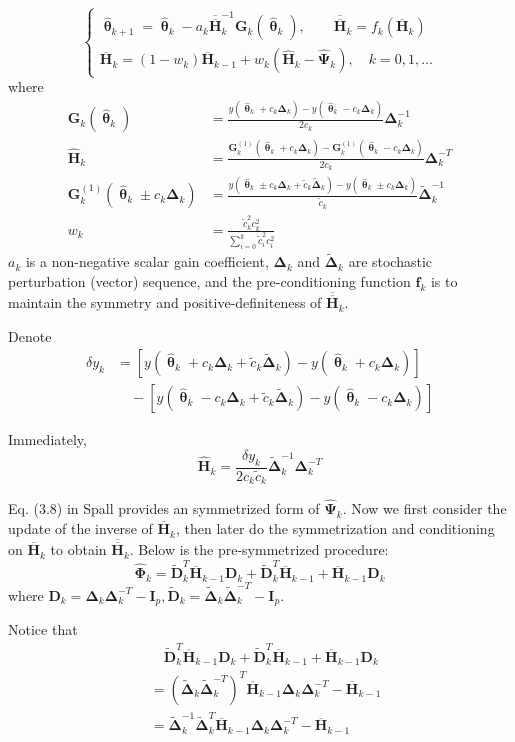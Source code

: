 \documentclass[conference]{IEEEtran}
\newcommand{\bD}{\bm{D}}
\newcommand{\bG}{\bm{G}}
\newcommand{\bI}{\bm{I}}
\newcommand{\bDelta}{\bm{\Delta}}
\newcommand{\oH}{\bm{\overline{H}}}
\newcommand{\ooH}{\bm{\overline{\overline{H}}}}
\newcommand{\hH}{\bm{\hat{H}}}
\newcommand{\hPsi}{\bm{\hat{\Psi}}}
\newcommand{\htheta}{\bm{\hat{\uptheta}}}
\newcommand{\hPhi}{\bm{\hat{\Phi}}}
\newcommand{\tDelta}{\bm{\tilde{\Delta}}}
\newcommand{\tD}{\bm{\tilde{D}}}
\begin{document}
$$\begin{cases}
	\htheta_{k+1}=\htheta_k-a_k\ooH_k^{-1} \bG_k(\htheta_k),\qquad \bm{\ooH}_k=f_k(\oH_k)\\
	\oH_k=(1-w_k)\oH_{k-1}+w_k(\hH_k-\hPsi_k), \quad k=0,1,\dots
\end{cases}$$
where
\begin{align*}
\bG_k(\htheta_k)&=\frac{y(\htheta_k+c_k\bDelta_k)-y(\htheta_k-c_k\bDelta_k)}{2c_k}\bDelta_k^{-1}\\
\hH_k&=\frac{\bG_k^{(1)}(\htheta_k+c_k\bDelta_k)-\bG_k^{(1)}(\htheta_k-c_k\bDelta_k)}{2c_k}\bDelta_k^{-T}\\
\bG_k^{(1)}(\htheta_k\pm c_k\bDelta_k)
&=\frac{y(\htheta_k\pm c_k\bDelta_k+\tilde{c}_k\tDelta_k)-y(\htheta_k\pm c_k\bDelta_k)}{\tilde{c}_k}\tDelta_k^{-1}\\
w_k&=\frac{\tilde{c}_k^2c_k^2}{\sum_{i=0}^{k}\tilde{c}_i^2c_i^2}
\end{align*}
$ a_k $ is a non-negative scalar gain coefficient, $ \bDelta_k $ and $ \tDelta_k $ are stochastic perturbation (vector) sequence, and the pre-conditioning function $ \bm{f}_k $ is to maintain the symmetry and positive-definiteness of $ \ooH_k $.

Denote
\begin{align*}
\delta y_k&=[y(\htheta_k+c_k\bDelta_k+\tilde{c}_k\tDelta_k)-y(\htheta_k+c_k\bDelta_k)]\\
&\quad-[y(\htheta_k-c_k\bDelta_k+\tilde{c}_k\tDelta_k)-y(\htheta_k-c_k\bDelta_k)]
\end{align*}

Immediately, $$ \hH_k=\frac{\delta y_k}{2c_k\tilde{c}_k}\tDelta_k^{-1}\bDelta_k^{-T} $$

Eq. (3.8) in Spall \cite{Spall2009} provides an symmetrized form of $ \hPsi_k $. Now we first consider the update of the inverse of $ \oH_k $, then later do the symmetrization and conditioning on $ \oH_k $ to obtain $ \ooH_k $. Below is the pre-symmetrized procedure:
$$ \hPhi_k=\tD_k^T\oH_{k-1}\bD_k+\tD_k^T\oH_{k-1}+\oH_{k-1}\bD_k $$
where $ \bD_k=\bDelta_k\bDelta_k^{-T}-\bI_p, \tD_k=\tDelta_k\tDelta_k^{-T}-\bI_p $.

Notice that
\begin{align*}
&\quad\tD_k^T\oH_{k-1}\bD_k+\tD_k^T\oH_{k-1}+\oH_{k-1}\bD_k\\
&=(\tDelta_k\tDelta_k^{-T})^T\oH_{k-1}\bDelta_k\bDelta_k^{-T}-\oH_{k-1}\\
&=\tDelta_k^{-1}\tDelta_k^{T}\oH_{k-1}\bDelta_k\bDelta_k^{-T}-\oH_{k-1}
\end{align*}
\end{document}
